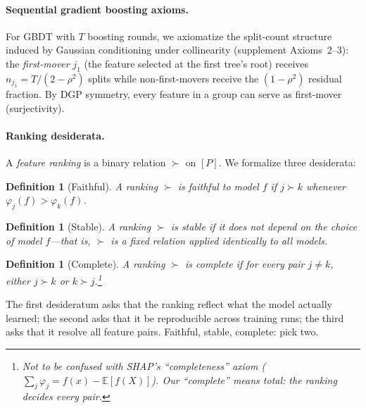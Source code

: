 \documentclass{article}
\newtheorem{definition}[theorem]{Definition}
\newcommand{\E}{\mathbb{E}}
\newcommand{\DASH}{\textsc{Dash}}
\newcommand{\GBDT}{\textsc{GBDT}}
\begin{document}
\paragraph{Sequential gradient boosting axioms.}
For \GBDT{} with $T$ boosting rounds, we axiomatize the split-count structure induced by Gaussian conditioning under collinearity (supplement Axioms~2--3): the \emph{first-mover} $j_1$ (the feature selected at the first tree's root) receives $n_{j_1} = T/(2{-}\rho^2)$ splits while non-first-movers receive the $(1{-}\rho^2)$ residual fraction. By DGP symmetry, every feature in a group can serve as first-mover (surjectivity).

\paragraph{Ranking desiderata.}
A \emph{feature ranking} is a binary relation $\succ$ on $[P]$.
We formalize three desiderata:

\begin{definition}[Faithful]
\label{def:faithful}
A ranking $\succ$ is \emph{faithful} to model $f$ if $j \succ k$ whenever $\varphi_j(f) > \varphi_k(f)$.
\end{definition}

\begin{definition}[Stable]
\label{def:stable}
A ranking $\succ$ is \emph{stable} if it does not depend on the choice of model $f$---that is, $\succ$ is a fixed relation applied identically to all models.
\end{definition}

\begin{definition}[Complete]
\label{def:complete}
A ranking $\succ$ is \emph{complete} if for every pair $j \neq k$, either $j \succ k$ or $k \succ j$.\footnote{Not to be confused with SHAP's ``completeness'' axiom ($\sum_j \varphi_j = f(x) - \E[f(X)]$). Our ``complete'' means \emph{total}: the ranking decides every pair.}
\end{definition}

The first desideratum asks that the ranking reflect what the model actually learned; the second asks that it be reproducible across training runs; the third asks that it resolve all feature pairs.
Faithful, stable, complete: pick two.

\end{document}
